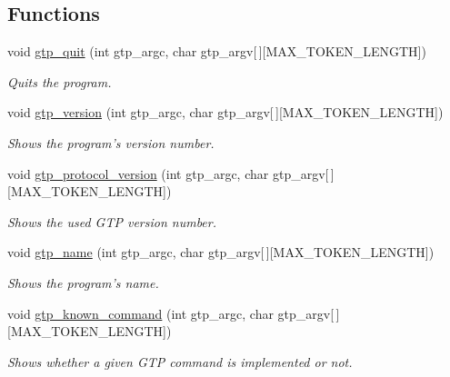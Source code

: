 \subsection*{Functions}
\begin{DoxyCompactItemize}
\item 
void \hyperlink{group___g_t_p___administrative___commands_ga625849e565ca8f4e13fc521165d73910}{gtp\_\-quit} (int gtp\_\-argc, char gtp\_\-argv\mbox{[}$\,$\mbox{]}\mbox{[}MAX\_\-TOKEN\_\-LENGTH\mbox{]})
\begin{DoxyCompactList}\small\item\em Quits the program. \item\end{DoxyCompactList}\item 
void \hyperlink{group___g_t_p___administrative___commands_ga264cb45ac6de56306d1006a4ee8a1f4d}{gtp\_\-version} (int gtp\_\-argc, char gtp\_\-argv\mbox{[}$\,$\mbox{]}\mbox{[}MAX\_\-TOKEN\_\-LENGTH\mbox{]})
\begin{DoxyCompactList}\small\item\em Shows the program's version number. \item\end{DoxyCompactList}\item 
void \hyperlink{group___g_t_p___administrative___commands_ga57d397237b5bc6129ada6cdcfeaa9aad}{gtp\_\-protocol\_\-version} (int gtp\_\-argc, char gtp\_\-argv\mbox{[}$\,$\mbox{]}\mbox{[}MAX\_\-TOKEN\_\-LENGTH\mbox{]})
\begin{DoxyCompactList}\small\item\em Shows the used GTP version number. \item\end{DoxyCompactList}\item 
void \hyperlink{group___g_t_p___administrative___commands_ga493e544f8b83dd08fb5ebf25c127fb60}{gtp\_\-name} (int gtp\_\-argc, char gtp\_\-argv\mbox{[}$\,$\mbox{]}\mbox{[}MAX\_\-TOKEN\_\-LENGTH\mbox{]})
\begin{DoxyCompactList}\small\item\em Shows the program's name. \item\end{DoxyCompactList}\item 
void \hyperlink{group___g_t_p___administrative___commands_gac1f9e22691e53c8b8aa46d473008c262}{gtp\_\-known\_\-command} (int gtp\_\-argc, char gtp\_\-argv\mbox{[}$\,$\mbox{]}\mbox{[}MAX\_\-TOKEN\_\-LENGTH\mbox{]})
\begin{DoxyCompactList}\small\item\em Shows whether a given GTP command is implemented or not. \item\end{DoxyCompactList}\item 

\end{DoxyCompactItemize}
